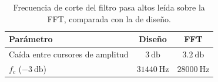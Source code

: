 \begin{table}[!ht]
  \centering
  \begin{tabular}{|l|c|c|}
    \hline
    Parámetro & Diseño & FFT \\
    \hline
    Caída entre cursores de amplitud & $\SI{3}{\decibel}$ & $\SI{3.2}{\decibel}$ \\
    $f_c$ ($\SI{-3}{\decibel}$) & $\SI{31440}{\hertz}$ & $\SI{28000}{\hertz}$ \\
    \hline
  \end{tabular}
  \caption{Frecuencia de corte del filtro pasa altos leída sobre la FFT, comparada con la de diseño.}
  \label{tab:pa-fft}
\end{table}
